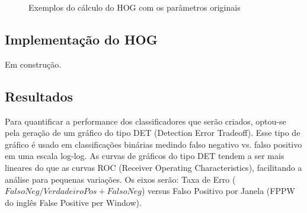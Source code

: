\begin{figure}[ht!]
\centering
{}
  \caption{Exemplos do cálculo do HOG com os parâmetros originais}
  \label{fig:hog_example1}
\end{figure}

\subsection{Implementação do HOG}

Em construção.

\subsection{Resultados}

Para quantificar a performance dos classificadores que serão criados, optou-se pela geração de um gráfico do tipo DET (Detection Error Tradeoff). Esse tipo de gráfico é usado em classificações binárias medindo falso negativo vs. falso positivo em uma escala log-log. As curvas de gráficos do tipo DET tendem a ser mais lineares do que as curvas ROC (Receiver Operating Characteristics), facilitando a análise para pequenas variações. Os eixos serão: Taxa de Erro (\(FalsoNeg/VerdadeiroPos + FalsoNeg\)) versus Falso Positivo por Janela (FPPW do inglês False Positive per Window).

